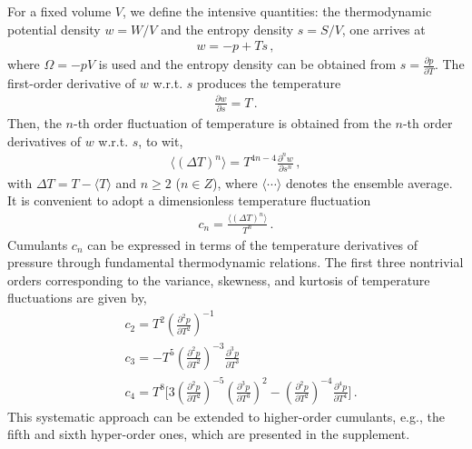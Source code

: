 \documentclass[aps,twocolumn,prd,superscriptaddress,nofootinbib,floatfix]{revtex4-2}
\begin{document}
For a fixed volume $V$, we define the intensive quantities: the thermodynamic potential density $w=W/V$ and the entropy density $s=S/V$, one arrives at
\begin{align}
    w=-p+T s\,, \label{}
\end{align}
where $\Omega=-pV$ is used and the entropy density can be obtained from $s=\frac{\partial p}{\partial T}$. The first-order derivative of $w$ w.r.t. $s$ produces the temperature
\begin{align}
    \frac{\partial w}{\partial s}=T\,. \label{}
\end{align}
Then, the $n$-th order fluctuation of temperature is obtained from the $n$-th order derivatives of $w$ w.r.t. $s$, to wit,
\begin{align}
    \langle(\Delta T)^n \rangle=T^{4n-4}\frac{\partial^n w}{\partial s^n}\,, \label{eq:DeltaTn}
\end{align}
with $\Delta T=T-\langle T \rangle$ and $n\geq 2$ ($n \in Z$), where $\langle \cdots \rangle$ denotes the ensemble average. It is convenient to adopt a dimensionless temperature fluctuation
\begin{align}
    c_n=\frac{\langle(\Delta T)^n \rangle}{T^n}\,. \label{eq:cn}
\end{align}
Cumulants $c_n$ can be expressed in terms of the temperature derivatives of pressure through fundamental thermodynamic relations. The first three nontrivial orders corresponding to the variance, skewness, and kurtosis of temperature fluctuations are given by,
\begin{equation}\label{eq:c234}\begin{split}
    & c_2=T^2\left(\frac{\partial^2 p}{\partial T^2}\right)^{-1}\,\\[2ex]
    & c_3=-T^5\left(\frac{\partial^2 p}{\partial T^2}\right)^{-3}\frac{\partial^3 p}{\partial T^3}\,\\[2ex]
    & c_4=T^8\Bigg[3\left(\frac{\partial^2 p}{\partial T^2}\right)^{-5}\left(\frac{\partial^3 p}{\partial T^3}\right)^2-\left(\frac{\partial^2 p}{\partial T^2}\right)^{-4}\frac{\partial^4 p}{\partial T^4}\Bigg]\,.
\end{split} 
\end{equation}
This systematic approach can be extended to higher-order cumulants, e.g., the fifth and sixth hyper-order ones, which are presented in the supplement.
\end{document}
